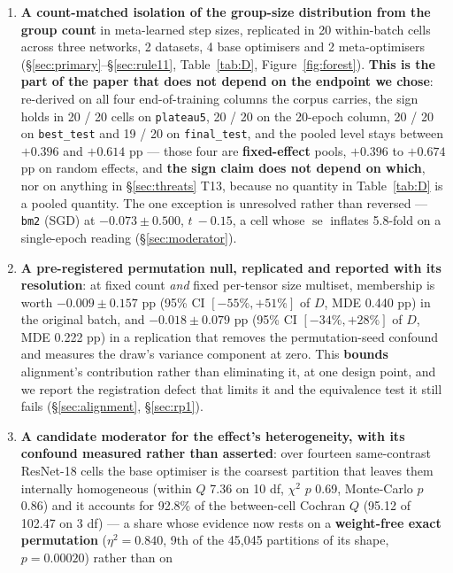 \documentclass[10pt,letterpaper]{article}
\newcommand{\Dstat}{D}                         %
\newcommand{\plateau}{\texttt{plateau5}}
\newcommand{\arm}[1]{\texttt{#1}}
\DeclareMathOperator{\se}{se}
\begin{document}
\begin{enumerate}
\item \textbf{A count-matched isolation of the group-size distribution from the group count}
  in meta-learned step sizes, replicated in 20 within-batch cells across three networks,
  2 datasets, 4 base optimisers and 2 meta-optimisers (\S\ref{sec:primary}--\S\ref{sec:rule11},
  Table~\ref{tab:D}, Figure~\ref{fig:forest}). \textbf{This is the part of the paper that does not
  depend on the endpoint we chose}: re-derived on all four end-of-training columns the corpus
  carries, the sign holds in 20 / 20 cells on \plateau{}, 20 / 20 on the 20-epoch column, 20 / 20
  on \texttt{best\_test} and 19 / 20 on \texttt{final\_test}, and the pooled level stays between
  $+0.396$ and $+0.614$ pp --- those four are \textbf{fixed-effect} pools, $+0.396$ to $+0.674$ pp
  on random effects, and \textbf{the sign claim does not depend on which}, nor on anything in
  \S\ref{sec:threats} T13, because no quantity in Table~\ref{tab:D} is a pooled quantity. The one
  exception is unresolved rather than reversed --- \arm{bm2}
  (SGD) at $-0.073 \pm 0.500$, $t\ -0.15$, a cell whose $\se$ inflates 5.8-fold on a single-epoch
  reading (\S\ref{sec:moderator}).
\item \textbf{A pre-registered permutation null, replicated and reported with its resolution}: at
  fixed count \emph{and} fixed per-tensor size multiset, membership is worth $-0.009 \pm 0.157$ pp
  (95\% CI $[-55\%, +51\%]$ of $\Dstat$, MDE 0.440 pp) in the original batch, and
  $-0.018 \pm 0.079$ pp (95\% CI $[-34\%, +28\%]$ of $\Dstat$, MDE 0.222 pp) in a replication that
  removes the permutation-seed confound and measures the draw's variance component at zero. This
  \textbf{bounds} alignment's contribution rather than eliminating it, at one
  design point, and we report the registration defect that limits it and the equivalence test it
  still fails (\S\ref{sec:alignment}, \S\ref{sec:rp1}).
\item \textbf{A candidate moderator for the effect's heterogeneity, with its confound measured
  rather than asserted}: over fourteen same-contrast ResNet-18 cells the base optimiser is the
  coarsest partition that leaves them internally homogeneous (within $Q$ 7.36 on 10 df,
  $\chi^2$ $p$ 0.69, Monte-Carlo $p$ 0.86) and it accounts for 92.8\% of the between-cell Cochran $Q$ (95.12 of 102.47 on
  3 df) --- a share whose evidence now rests on a \textbf{weight-free exact permutation}
  ($\eta^2 = 0.840$, 9th of the 45{,}045 partitions of its shape, $p = 0.00020$) rather than on

\end{enumerate}
\end{document}
